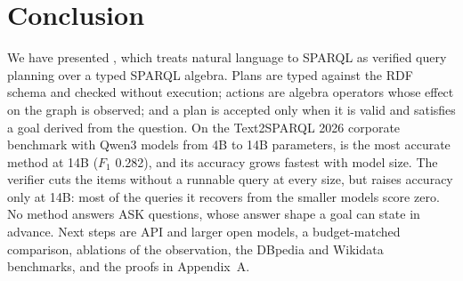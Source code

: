 \section{Conclusion}
\label{sec-conclude}

We have presented \hermes, which treats natural language to SPARQL as
verified query planning over a typed SPARQL algebra.
Plans are typed against the RDF schema and checked without execution;
actions are algebra operators whose effect on the graph is observed;
and a plan is accepted only when it is valid and satisfies a goal
derived from the question.
On the Text2SPARQL 2026 corporate benchmark with Qwen3 models from 4B
to 14B parameters, \hermes is the most accurate method at 14B
($F_1$ 0.282), and its accuracy grows fastest with model size.
The verifier cuts the items without a runnable query at every size, but
raises accuracy only at 14B: most of the queries it recovers from the
smaller models score zero.
No method answers ASK questions, whose answer shape a goal can state in
advance.
Next steps are API and larger open models, a budget-matched comparison,
ablations of the observation, the DBpedia and Wikidata benchmarks, and
the proofs in Appendix~A.
